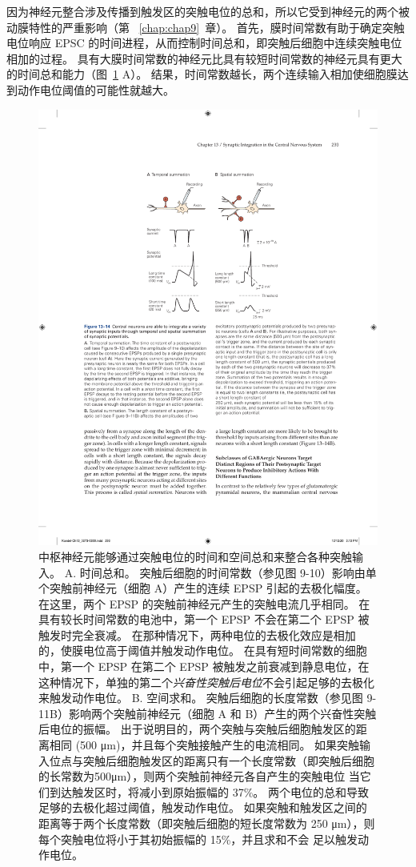 因为神经元整合涉及传播到触发区的突触电位的总和，所以它受到神经元的两个被动膜特性的严重影响（第  ~\ref{chap:chap9}~章）。
首先，膜时间常数有助于确定突触电位响应 EPSC 的时间进程，从而控制时间总和，即突触后细胞中连续突触电位相加的过程。
具有大膜时间常数的神经元比具有较短时间常数的神经元具有更大的时间总和能力（图~\ref{fig:13_14} A）。
结果，时间常数越长，两个连续输入相加使细胞膜达到动作电位阈值的可能性就越大。


\begin{figure}[htbp]
	\centering
	\includegraphics[width=0.6\linewidth]{chap13/fig_13_14}
	\caption{中枢神经元能够通过突触电位的时间和空间总和来整合各种突触输入。 A. 时间总和。 突触后细胞的时间常数（参见图 9-10）影响由单个突触前神经元（细胞 A）产生的连续 EPSP 引起的去极化幅度。 在这里，两个 EPSP 的突触前神经元产生的突触电流几乎相同。 在具有较长时间常数的电池中，第一个 EPSP 不会在第二个 EPSP 被触发时完全衰减。 在那种情况下，两种电位的去极化效应是相加的，使膜电位高于阈值并触发动作电位。 在具有短时间常数的细胞中，第一个 EPSP 在第二个 EPSP 被触发之前衰减到静息电位，在这种情况下，单独的第二个\textit{兴奋性突触后电位}不会引起足够的去极化来触发动作电位。 B. 空间求和。 突触后细胞的长度常数（参见图 9-11B）影响两个突触前神经元（细胞 A 和 B）产生的两个兴奋性突触后电位的振幅。 出于说明目的，两个突触与突触后细胞触发区的距离相同 (500 μm)，并且每个突触接触产生的电流相同。 如果突触输入位点与突触后细胞触发区的距离只有一个长度常数（即突触后细胞的长常数为500μm），则两个突触前神经元各自产生的突触电位 当它们到达触发区时，将减小到原始振幅的 37\%。 两个电位的总和导致足够的去极化超过阈值，触发动作电位。 如果突触和触发区之间的距离等于两个长度常数（即突触后细胞的短长度常数为 250 μm），则每个突触电位将小于其初始振幅的 15\%，并且求和不会 足以触发动作电位。}
	\label{fig:13_14}
\end{figure}


